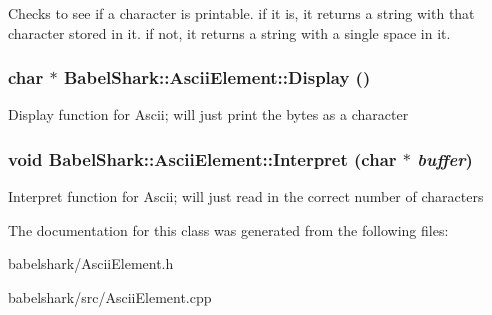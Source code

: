 Checks to see if a character is printable. if it is, it returns a string with that character stored in it. if not, it returns a string with a single space in it. \hypertarget{class_babel_shark_1_1_ascii_element_a10391d6cea4ab7ad45be370fed9d4d0}{
\subsubsection[{Display}]{\setlength{\rightskip}{0pt plus 5cm}char $\ast$ BabelShark::AsciiElement::Display ()}}
\label{class_babel_shark_1_1_ascii_element_a10391d6cea4ab7ad45be370fed9d4d0}


Display function for Ascii; will just print the bytes as a character \hypertarget{class_babel_shark_1_1_ascii_element_452958c460980a70b80d02b659c11057}{
\subsubsection[{Interpret}]{\setlength{\rightskip}{0pt plus 5cm}void BabelShark::AsciiElement::Interpret (char $\ast$ {\em buffer})}}
\label{class_babel_shark_1_1_ascii_element_452958c460980a70b80d02b659c11057}


Interpret function for Ascii; will just read in the correct number of characters 

The documentation for this class was generated from the following files:\begin{CompactItemize}
\item 
babelshark/AsciiElement.h\item 
babelshark/src/AsciiElement.cpp\end{CompactItemize}
